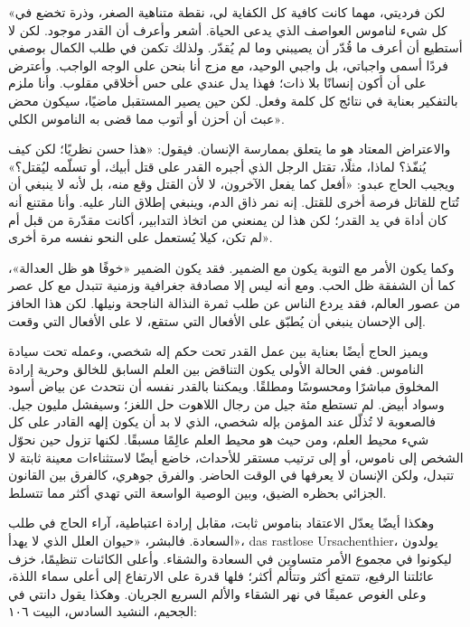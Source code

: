 «لكن فرديتي، مهما كانت كافية كل الكفاية لي، نقطة متناهية الصغر، وذرة تخضع في كل شيء لناموس العواصف الذي يدعى الحياة. أشعر وأعرف أن القدر موجود. لكن لا أستطيع أن أعرف ما قُدّر أن يصيبني وما لم يُقدّر. ولذلك تكمن في طلب الكمال بوصفي فردًا أسمى واجباتي، بل واجبي الوحيد، مع مزج أنا بنحن على الوجه الواجب. وأعترض على أن أكون إنسانًا بلا ذات؛ فهذا يدل عندي على حس أخلاقي مقلوب. وأنا ملزم بالتفكير بعناية في نتائج كل كلمة وفعل. لكن حين يصير المستقبل ماضيًا، سيكون محض عبث أن أحزن أو أتوب مما قضى به الناموس الكلي».

والاعتراض المعتاد هو ما يتعلق بممارسة الإنسان. فيقول: «هذا حسن نظريًا؛ لكن كيف يُنفّذ؟ لماذا، مثلًا، تقتل الرجل الذي أجبره القدر على قتل أبيك، أو تسلّمه ليُقتل؟» ويجيب الحاج عبدو: «أفعل كما يفعل الآخرون، لا لأن القتل وقع منه، بل لأنه لا ينبغي أن تُتاح للقاتل فرصة أخرى للقتل. إنه نمر ذاق الدم، وينبغي إطلاق النار عليه. وأنا مقتنع أنه كان أداة في يد القدر؛ لكن هذا لن يمنعني من اتخاذ التدابير، أكانت مقدّرة من قبل أم لم تكن، كيلا يُستعمل على النحو نفسه مرة أخرى».

وكما يكون الأمر مع التوبة يكون مع الضمير. فقد يكون الضمير «خوفًا هو ظل العدالة»، كما أن الشفقة ظل الحب. ومع أنه ليس إلا مصادفة جغرافية وزمنية تتبدل مع كل عصر من عصور العالم، فقد يردع الناس عن طلب ثمرة النذالة الناجحة ونيلها. لكن هذا الحافز إلى الإحسان ينبغي أن يُطبّق على الأفعال التي ستقع، لا على الأفعال التي وقعت.

ويميز الحاج أيضًا بعناية بين عمل القدر تحت حكم إله شخصي، وعمله تحت سيادة الناموس. ففي الحالة الأولى يكون التناقض بين العلم السابق للخالق وحرية إرادة المخلوق مباشرًا ومحسوسًا ومطلقًا. ويمكننا بالقدر نفسه أن نتحدث عن بياض أسود وسواد أبيض. لم تستطع مئة جيل من رجال اللاهوت حل اللغز؛ وسيفشل مليون جيل. فالصعوبة لا تُذلّل عند المؤمن بإله شخصي، الذي لا بد أن يكون إلهه القادر على كل شيء محيط العلم، ومن حيث هو محيط العلم عالِمًا مسبقًا. لكنها تزول حين نحوّل الشخص إلى ناموس، أو إلى ترتيب مستقر للأحداث، خاضع أيضًا لاستثناءات معينة ثابتة لا تتبدل، ولكن الإنسان لا يعرفها في الوقت الحاضر. والفرق جوهري، كالفرق بين القانون الجزائي بحظره الضيق، وبين الوصية الواسعة التي تهدي أكثر مما تتسلط.

وهكذا أيضًا يعدّل الاعتقاد بناموس ثابت، مقابل إرادة اعتباطية، آراء الحاج في طلب السعادة. فالبشر، «حيوان العلل الذي لا يهدأ»، \textenglish{das rastlose Ursachenthier}، يولدون ليكونوا في مجموع الأمر متساوين في السعادة والشقاء. وأعلى الكائنات تنظيمًا، خزف عائلتنا الرفيع، تتمتع أكثر وتتألم أكثر؛ فلها قدرة على الارتفاع إلى أعلى سماء اللذة، وعلى الغوص عميقًا في نهر الشقاء والألم السريع الجريان. وهكذا يقول دانتي في الجحيم، النشيد السادس، البيت ١٠٦:

